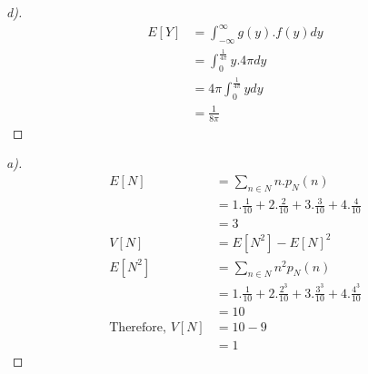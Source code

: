 \documentclass[12pt]{article}
\newenvironment{theorem}[2][Theorem]{\begin{trivlist}
\item[\hskip \labelsep {\bfseries #1}\hskip \labelsep {\bfseries #2.}]}{\end{trivlist}}
\begin{document}
\begin{proof}[d)]
\begin{align*}
E[Y] &= \int_{-\infty}^{\infty} g(y).f(y) dy \\
&= \int_{0}^{\frac{1}{4\pi}}y.4\pi dy\\
&=4\pi \int_{0}^{\frac{1}{4\pi}} y dy\\
&=\frac{1}{8\pi}
\end{align*} 
\end{proof}
\pagebreak
\begin{theorem}[Ans]{5}
\begin{proof}[a)]
\begin{align*}
    E[N] & = \sum_{n\in N}n.p_{N}(n) \\
    &= 1.\frac{1}{10} + 2.\frac{2}{10} + 3.\frac{3}{10} + 4.\frac{4}{10}\\
    &= 3\\
    V[N] &= E[N^{2}] - E[N]^{2}\\
    E[N^2]&=\sum_{n\in N} n^{2}p_{N}(n)\\
    &=1.\frac{1}{10} + 2.\frac{2^{3}}{10} + 3.\frac{3^{3}}{10} + 4.\frac{4^{3}}{10}\\
    &=10\\
    \text{Therefore, }V[N]&= 10-9 \\&= 1
\end{align*}
\end{proof}


\end{theorem}
\end{document}
